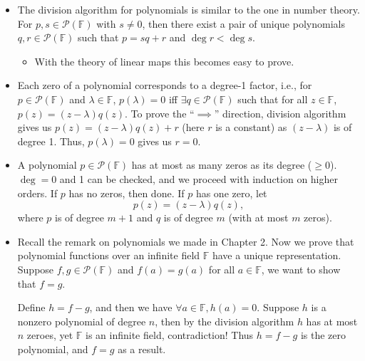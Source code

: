 \documentclass{article}
\newcommand{\F}{\mathbb{F}}
\newcommand{\PF}{\mathcal{P}(\F)}
\begin{document}
\begin{itemize}
    \item The division algorithm for polynomials is similar to the one in number theory. For $p,s \in \mathcal{P}(\F)$ with $s \not= 0$, then there exist a pair of unique polynomials $q,r \in \mathcal{P}(\F)$ such that $p=sq+r$ and $\deg r < \deg s$.
    \begin{itemize}
        \item With the theory of linear maps this becomes easy to prove.
    \end{itemize}
    \item Each zero of a polynomial corresponds to a degree-1 factor, i.e., for $p \in \PF$ and $\lambda \in \F$, $p(\lambda) = 0$ iff $\exists q \in \PF$ such that for all $z \in \F$, $p(z) = (z-\lambda)q(z)$. To prove the ``$\implies$'' direction, division algorithm gives us $p(z) = (z-\lambda)q(z) + r$ (here $r$ is a constant) as $(z-\lambda)$ is of degree 1. Thus, $p(\lambda) = 0$ gives us $r=0$.
    
    \item A polynomial $p \in \PF$ has at most as many zeros as its degree ($\geq 0$). $\deg = 0$ and 1 can be checked, and we proceed with induction on higher orders. If $p$ has no zeros, then done. If $p$ has one zero, let $$p(z) = (z-\lambda)q(z),$$ where $p$ is of degree $m+1$ and $q$ is of degree $m$ (with at most $m$ zeros).
    
    \item Recall the remark on polynomials we made in Chapter 2. Now we prove that polynomial functions over an infinite field $\F$ have a unique representation. Suppose $f,g \in \PF$ and $f(a)=g(a)$ for all $a \in \F$, we want to show that $f=g$.
    
    Define $h = f-g$, and then we have $\forall a\in\F, h(a) = 0$. Suppose $h$ is a nonzero polynomial of degree $n$, then by the division algorithm $h$ has at most $n$ zeroes, yet $\F$ is an infinite field, contradiction! Thus $h = f-g$ is the zero polynomial, and $f = g$ as a result.
    

\end{itemize}
\end{document}
